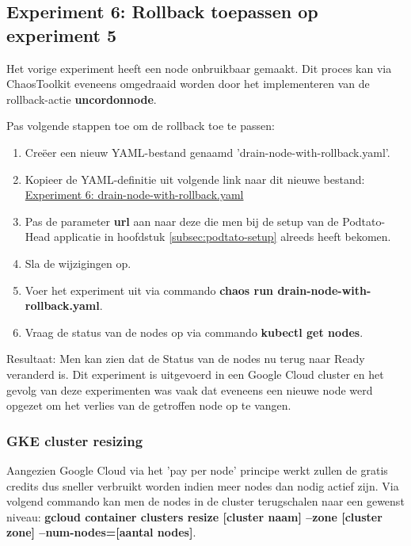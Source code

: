 \subsection{Experiment 6: Rollback toepassen op experiment 5}

Het vorige experiment heeft een node onbruikbaar gemaakt. Dit proces kan via ChaosToolkit eveneens omgedraaid worden door het implementeren van de rollback-actie {\bf uncordon\textunderscore node}. \autocite{Chaostoolkit2022f}

Pas volgende stappen toe om de rollback toe te passen:
\begin{enumerate}
    \item Creëer een nieuw YAML-bestand genaamd 'drain-node-with-rollback.yaml'.
    \item Kopieer de YAML-definitie uit volgende link naar dit nieuwe bestand: \href{https://github.com/KenBruggeman/BP\textunderscore 21-22/blob/master/bachelorproef/docs/chaostoolkit%20experimenten/drain-node-with-rollback.yaml}{Experiment 6: drain-node-with-rollback.yaml}
    \item Pas de parameter {\bf url} aan naar deze die men bij de setup van de Podtato-Head applicatie in hoofdstuk \ref{subsec:podtato-setup} alreeds heeft bekomen.
    \item Sla de wijzigingen op.
    \item Voer het experiment uit via commando {\bf chaos run drain-node-with-rollback.yaml}. 
    \item Vraag de status van de nodes op via commando {\bf kubectl get nodes}.
\end{enumerate}

Resultaat: Men kan zien dat de Status van de nodes nu terug naar Ready veranderd is. Dit experiment is uitgevoerd in een Google Cloud cluster en het gevolg van deze experimenten was vaak dat eveneens een nieuwe node werd opgezet om het verlies van de getroffen node op te vangen. 

\subsubsection{GKE cluster resizing}

Aangezien Google Cloud via het 'pay per node' principe werkt zullen de gratis credits dus sneller
verbruikt worden indien meer nodes dan nodig actief zijn. Via volgend commando kan men de nodes in
de cluster terugschalen naar een gewenst niveau: {\bf gcloud container clusters resize [cluster naam] --zone [cluster zone] --num-nodes=[aantal nodes]}. 

